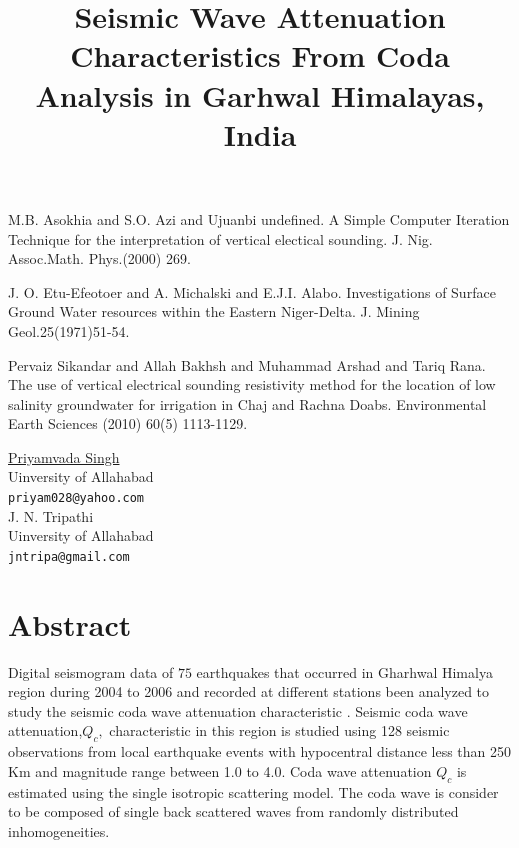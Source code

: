 \documentclass[article,A4,11pt]{llncs}%
\begin{document}

\begin{thebibliography}{10}
{\sc M.B. Asokhia and S.O. Azi and Ujuanbi undefined}. {A Simple Computer Iteration Technique for the interpretation of vertical electical sounding}. J. Nig. Assoc.Math. Phys.(2000) 269.

{\sc J. O. Etu-Efeotoer and A. Michalski and E.J.I. Alabo}. {Investigations of Surface Ground Water resources within the Eastern Niger-Delta}. J. Mining Geol.25(1971)51-54.

{\sc  Pervaiz Sikandar and Allah Bakhsh and Muhammad Arshad and Tariq Rana}. {The use of vertical electrical sounding resistivity method for the location of low salinity groundwater for irrigation in Chaj and Rachna Doabs}.  Environmental Earth Sciences (2010) 60(5) 1113-1129.
\end{thebibliography}

\title{Seismic Wave Attenuation Characteristics  From Coda Analysis in Garhwal Himalayas, India}
 \author{} \institute{}
\maketitle
\begin{center}
{\large \underline{Priyamvada Singh}}\\
Uinversity of Allahabad\\
{\tt priyam028@yahoo.com}
\\ \vspace{4mm}
{\large J. N. Tripathi}\\
Uinversity of Allahabad\\
{\tt jntripa@gmail.com}
\end{center}

\section*{Abstract}
Digital seismogram data of $75$ earthquakes that occurred in Gharhwal  Himalya region during 2004 to 2006 and recorded at different  stations been analyzed to study the seismic coda wave attenuation characteristic . Seismic coda wave attenuation,$Q_{c},$ characteristic in this region is studied using  128 seismic observations from local earthquake events with hypocentral distance less than 250 Km and magnitude range between 1.0 to 4.0. Coda wave attenuation $Q_{c}$ is estimated using the single isotropic scattering model. The coda wave is consider to be composed of single back scattered waves from randomly distributed inhomogeneities.
\end{document}
